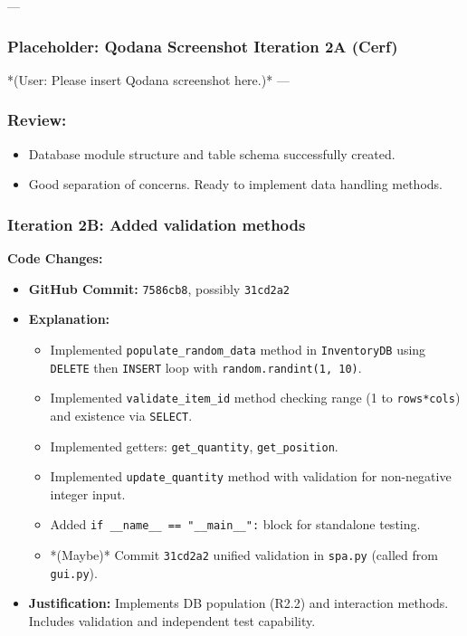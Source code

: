 --- %
\subsubsection*{Placeholder: Qodana Screenshot Iteration 2A (Cerf)}
*(User: Please insert Qodana screenshot here.)*
---

\subsubsection{Review:}
\begin{itemize}
	\item Database module structure and table schema successfully created.
	\item Good separation of concerns. Ready to implement data handling methods.
\end{itemize}

\newpage

\subsubsection{Iteration 2B: Added validation methods}

\textbf{Code Changes:}
\begin{itemize}
	\item \textbf{GitHub Commit:} \verb|7586cb8|, possibly \verb|31cd2a2|
	\item \textbf{Explanation:}
	\begin{itemize}
		\item Implemented \verb|populate_random_data| method in \verb|InventoryDB| using \verb|DELETE| then \verb|INSERT| loop with \verb|random.randint(1, 10)|.
		\item Implemented \verb|validate_item_id| method checking range (1 to \verb|rows*cols|) and existence via \verb|SELECT|.
		\item Implemented getters: \verb|get_quantity|, \verb|get_position|.
		\item Implemented \verb|update_quantity| method with validation for non-negative integer input.
		\item Added \verb|if __name__ == "__main__":| block for standalone testing.
		\item *(Maybe)* Commit \verb|31cd2a2| unified validation in \verb|spa.py| (called from \verb|gui.py|).
	\end{itemize}
	\item \textbf{Justification:} Implements DB population (R2.2) and interaction methods. Includes validation and independent test capability.
\end{itemize}

